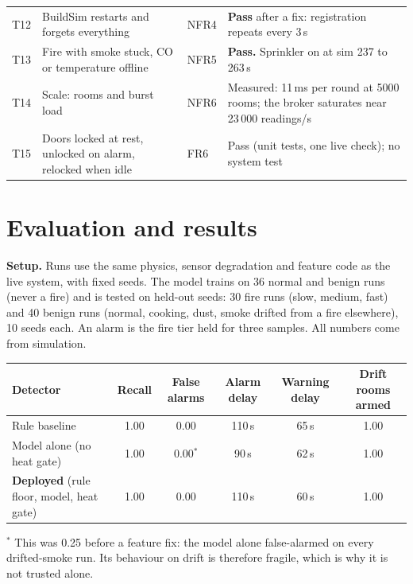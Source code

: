 \documentclass[11pt]{article}
\begin{document}
{\begin{longtable}{@{}L{1.6cm}L{6.2cm}L{1.9cm}L{5.9cm}@{}}
T12 & BuildSim restarts and forgets everything & NFR4 & \textbf{Pass} after a fix: registration repeats every 3\,s\\
T13 & Fire with smoke stuck, CO or temperature offline & NFR5 & \textbf{Pass.} Sprinkler on at sim 237 to 263\,s\\
T14 & Scale: rooms and burst load & NFR6 & Measured: 11\,ms per round at 5000 rooms; the broker saturates near 23\,000 readings/s\\
T15 & Doors locked at rest, unlocked on alarm, relocked when idle & FR6 & Pass (unit tests, one live check); no system test\\
\bottomrule
\end{longtable}}

\section{Evaluation and results}\label{sec:eval}

\textbf{Setup.} Runs use the same physics, sensor degradation and feature code as the live system, with fixed seeds. The model trains on 36 normal and benign runs (never a fire) and is tested on held-out seeds: 30 fire runs (slow, medium, fast) and 40 benign runs (normal, cooking, dust, smoke drifted from a fire elsewhere), 10 seeds each. An alarm is the fire tier held for three samples. All numbers come from simulation.

\begin{center}
\begin{tabular}{@{}lccccc@{}}
\toprule
Detector & Recall & False alarms & Alarm delay & Warning delay & Drift rooms armed\\
\midrule
Rule baseline & 1.00 & 0.00 & 110\,s & 65\,s & 1.00\\
Model alone (no heat gate) & 1.00 & 0.00$^\ast$ & 90\,s & 62\,s & 1.00\\
\textbf{Deployed} (rule floor, model, heat gate) & 1.00 & 0.00 & 110\,s & 60\,s & 1.00\\
\bottomrule
\end{tabular}
\end{center}
$^\ast$ This was 0.25 before a feature fix: the model alone false-alarmed on every drifted-smoke run. Its behaviour on drift is therefore fragile, which is why it is not trusted alone.
\end{document}
